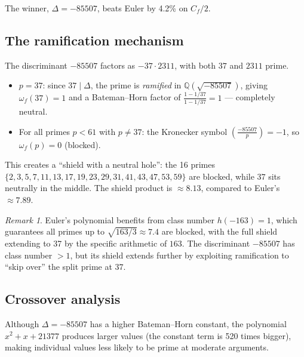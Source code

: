 \documentclass[11pt,a4paper]{article}
\theoremstyle{definition}
\theoremstyle{remark}
\newtheorem{remark}[theorem]{Remark}
\newcommand{\Q}{\mathbb{Q}}
\begin{document}
The winner, $\Delta = -85507$, beats Euler by 4.2\% on $C_f/2$.


\subsection{The ramification mechanism}\label{sec:ramification}

The discriminant $-85507$ factors as $-37 \cdot 2311$, with both $37$ and $2311$ prime.

\begin{itemize}
\item $p = 37$: since $37 \mid \Delta$, the prime is \emph{ramified} in $\Q(\sqrt{-85507})$, giving $\omega_f(37) = 1$ and a Bateman--Horn factor of $\frac{1-1/37}{1-1/37} = 1$ --- completely neutral.

\item For all primes $p < 61$ with $p \neq 37$: the Kronecker symbol $\left(\frac{-85507}{p}\right) = -1$, so $\omega_f(p) = 0$ (blocked).
\end{itemize}

This creates a ``shield with a neutral hole'': the 16 primes $\{2, 3, 5, 7, 11, 13, 17, 19, 23, 29, 31, 41, 43, 47, 53, 59\}$ are blocked, while $37$ sits neutrally in the middle.
The shield product is $\approx 8.13$, compared to Euler's $\approx 7.89$.

\begin{remark}
Euler's polynomial benefits from class number $h(-163) = 1$, which guarantees all primes up to $\sqrt{163/3} \approx 7.4$ are blocked, with the full shield extending to 37 by the specific arithmetic of $163$.
The discriminant $-85507$ has class number $> 1$, but its shield extends further by exploiting ramification to ``skip over'' the split prime at $37$.
\end{remark}


\subsection{Crossover analysis}

Although $\Delta = -85507$ has a higher Bateman--Horn constant, the polynomial $x^2+x+21377$ produces larger values (the constant term is 520 times bigger), making individual values less likely to be prime at moderate arguments.
\end{document}
